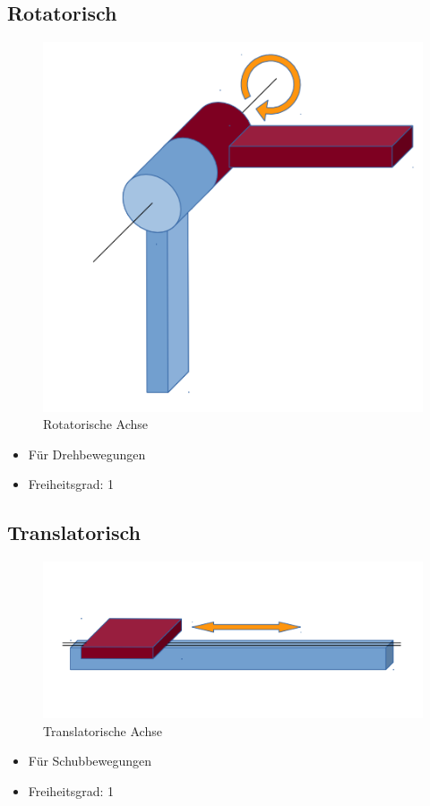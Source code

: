 \subsection{Rotatorisch}
\begin{figure}[H]
	\begin{center}
		\includegraphics[scale=0.6]{Resources/PNG/Rotatorisch.PNG}
		\caption{Rotatorische Achse}
		\label{fig:PNG/Rotatorisch.PNG}
	\end{center}
\end{figure}
\begin{itemize}
	\item Für Drehbewegungen
	\item Freiheitsgrad: 1
\end{itemize}
\subsection{Translatorisch}
\begin{figure}[H]
	\begin{center}
		\includegraphics[scale=0.6]{Resources/PNG/Translatorisch.PNG}
		\caption{Translatorische Achse}
		\label{fig:PNG/Translatorisch.PNG}
	\end{center}
\end{figure}
\begin{itemize}
	\item Für Schubbewegungen
	\item Freiheitsgrad: 1
\end{itemize}
